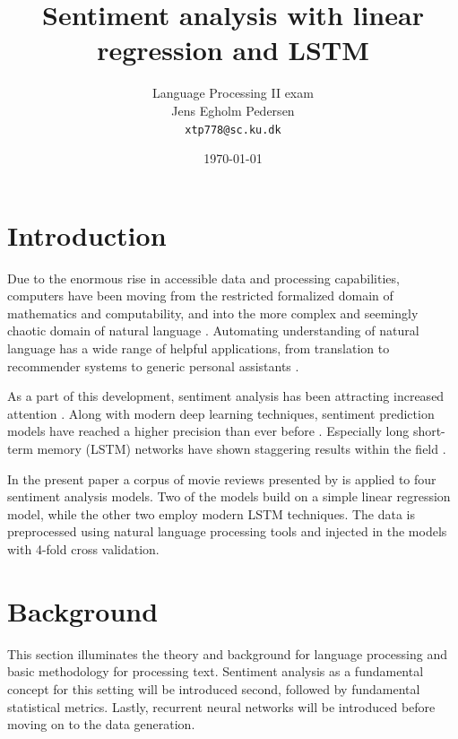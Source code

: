 \documentclass[a4paper]{article}
\title{Sentiment analysis with linear regression and LSTM}
\author{Language Processing II exam \\ Jens Egholm Pedersen \\ \texttt{xtp778@sc.ku.dk}}
\date{\today}
\begin{document}
\begin{titlepage}
\maketitle

\tableofcontents
\end{titlepage}

\pagebreak

\section{Introduction}
\label{sec:introduction}
Due to the enormous rise in accessible data and processing capabilities,
computers have been moving from the restricted formalized domain of
mathematics and computability, and into the more complex and seemingly
chaotic domain of natural language \citep{NILSSON2009, Jurafsky2000}. Automating
understanding of natural language has a wide range of helpful applications,
from translation to recommender systems to generic personal assistants
\citep{COX2005, BKL2009}.

As a part of this development, sentiment analysis has been attracting increased
attention \citep{BKL2009, Jurafsky2000}. Along with modern deep learning
techniques, sentiment prediction models have reached a higher precision
than ever before \citep{Jurafsky2000, Schmidhuber2015}.
Especially long short-term memory (LSTM) networks have shown staggering results
within the field \citep{Schmidhuber2015}.

In the present paper a corpus of movie reviews presented by \cite{PangLee2005}
is applied to four sentiment analysis models.
Two of the models build on a simple linear regression model, while the other
two employ modern LSTM techniques. The data is preprocessed using natural
language processing tools and injected in the models with 4-fold cross
validation.

\section{Background}
\label{sec:background}
This section illuminates the theory and background for language processing
and basic methodology for processing text.
Sentiment analysis as a fundamental concept for this setting will be introduced
second, followed by fundamental statistical metrics. Lastly,
recurrent neural networks will be introduced before moving on to the data
generation.
\end{document}
